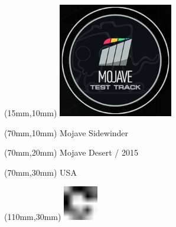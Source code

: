 \null\newpage
\begin{textblock*}{50mm}(15mm,10mm)%
\includegraphics[width=50mm]{LG/MOJA.png}
\end{textblock*}
\begin{textblock*}{130mm}(70mm,10mm)%
{\fontsize{20}{20}\selectfont Mojave Sidewinder}\\
\end{textblock*}
\begin{textblock*}{120mm}(70mm,20mm)%
{\fontsize{16}{16}\selectfont Mojave Desert / 2015}\\
\end{textblock*}
\begin{textblock*}{120mm}(70mm,30mm)%
{\fontsize{12}{12}\selectfont USA}
\end{textblock*}
\begin{textblock*}{30mm}(110mm,30mm)%
\centering
\includegraphics[height=15mm]{icons/fa-rotate-right.pdf}
\end{textblock*}
